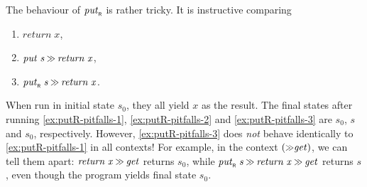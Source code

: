 \documentclass{jfp}
\newcommand{\Varid}[1]{\mathit{#1}}
\let\Varid\mathit
\begin{document}
The behaviour of \ensuremath{\Varid{put}_{\scaleobj{0.7}{\sf R}}} is rather tricky. It is instructive comparing
\begin{enumerate}[label=(\alph*)]
\item \ensuremath{\Varid{return}\;\Varid{x}},  \label{ex:putR-pitfalls-1}
\item \ensuremath{\Varid{put}\;\Varid{s}\mathbin{\hstretch{0.7}{>\!\!>}}\Varid{return}\;\Varid{x}}, \label{ex:putR-pitfalls-2}
\item \ensuremath{\Varid{put}_{\scaleobj{0.7}{\sf R}}\;\Varid{s}\mathbin{\hstretch{0.7}{>\!\!>}}\Varid{return}\;\Varid{x}}. \label{ex:putR-pitfalls-3}
\end{enumerate}
When run in initial state \ensuremath{\Varid{s}_{0}}, they all yield \ensuremath{\Varid{x}} as the result.
The final states after running \ref{ex:putR-pitfalls-1}, \ref{ex:putR-pitfalls-2} and \ref{ex:putR-pitfalls-3} are \ensuremath{\Varid{s}_{0}}, \ensuremath{\Varid{s}} and \ensuremath{\Varid{s}_{0}}, respectively.
However, \ref{ex:putR-pitfalls-3} does {\em not} behave identically to \ref{ex:putR-pitfalls-1} in all contexts!
For example, in the context \ensuremath{(\mathbin{\hstretch{0.7}{>\!\!>}}\Varid{get})}, we can tell them apart:
\ensuremath{\Varid{return}\;\Varid{x}\mathbin{\hstretch{0.7}{>\!\!>}}\Varid{get}} returns \ensuremath{\Varid{s}_{0}}, while \ensuremath{\Varid{put}_{\scaleobj{0.7}{\sf R}}\;\Varid{s}\mathbin{\hstretch{0.7}{>\!\!>}}\Varid{return}\;\Varid{x}\mathbin{\hstretch{0.7}{>\!\!>}}\Varid{get}} returns \ensuremath{\Varid{s}}, even though the program yields final state \ensuremath{\Varid{s}_{0}}.
\end{document}
